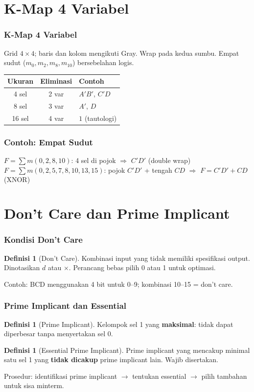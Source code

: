 \documentclass[handout]{beamer}
\theoremstyle{definition}
\newtheorem{definisi}[theorem]{Definisi}
\theoremstyle{example}
\begin{document}
\section{K-Map 4 Variabel}

\begin{frame}
\frametitle{K-Map 4 Variabel}
Grid $4 \times 4$; baris dan kolom mengikuti Gray. Wrap pada kedua sumbu. Empat sudut ($m_0, m_2, m_8, m_{10}$) bersebelahan logis.
\begin{center}
\small
\begin{tabular}{|c|c|l|}
\hline
\textbf{Ukuran} & \textbf{Eliminasi} & \textbf{Contoh} \\ \hline
4 sel & 2 var & $A'B'$, $C'D$ \\ \hline
8 sel & 3 var & $A'$, $D$ \\ \hline
16 sel & 4 var & $1$ (tautologi) \\ \hline
\end{tabular}
\end{center}
\end{frame}

\begin{frame}
\frametitle{Contoh: Empat Sudut}
$F = \sum m(0,2,8,10)$: 4 sel di pojok $\Rightarrow$ $C'D'$ (double wrap)\\
$F = \sum m(0,2,5,7,8,10,13,15)$: pojok $C'D'$ + tengah $CD$ $\Rightarrow$ $F = C'D' + CD$ (XNOR)
\end{frame}

\section{Don't Care dan Prime Implicant}

\begin{frame}
\frametitle{Kondisi Don't Care}
\begin{definisi}[Don't Care]
Kombinasi input yang tidak memiliki spesifikasi output. Dinotasikan $d$ atau $\times$. Perancang bebas pilih 0 atau 1 untuk optimasi.
\end{definisi}
Contoh: BCD menggunakan 4 bit untuk 0--9; kombinasi 10--15 = don't care.
\end{frame}

\begin{frame}
\frametitle{Prime Implicant dan Essential}
\begin{definisi}[Prime Implicant]
Kelompok sel 1 yang \textbf{maksimal}: tidak dapat diperbesar tanpa menyertakan sel 0.
\end{definisi}
\begin{definisi}[Essential Prime Implicant]
Prime implicant yang mencakup minimal satu sel 1 yang \textbf{tidak dicakup} prime implicant lain. Wajib disertakan.
\end{definisi}
Prosedur: identifikasi prime implicant $\rightarrow$ tentukan essential $\rightarrow$ pilih tambahan untuk sisa minterm.
\end{frame}
\end{document}
